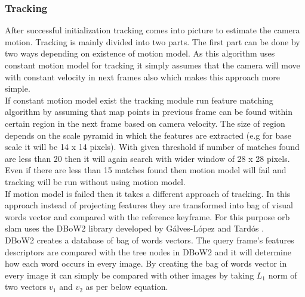 \subsubsection{Tracking}
After successful initialization tracking comes into picture to estimate the camera motion.
Tracking is mainly divided into two parts. The first part can be done by two ways depending on existence of motion model. As this algorithm uses constant motion model for tracking it simply assumes that the camera will move with constant velocity in next frames also which makes this approach more simple. \\
\linebreak
If constant motion model exist the tracking module run feature matching algorithm by assuming that map points in previous frame can be found within certain region in the next frame based on camera velocity. The size of region depends on the scale pyramid in which the features are extracted (e.g for base scale it will be 14 x 14 pixels). With given threshold if number of matches found are less than 20 then it will again search with wider window of 28 x 28 pixels. Even if there are less than 15 matches found then motion model will fail and 
tracking will be run without using motion model.\\
\linebreak
If motion model is failed then it takes a different approach of tracking. In this approach instead of projecting features they are transformed into bag of visual words vector and compared with the reference keyframe. For this purpose \acrshort{orb} \acrshort{slam} uses the DBoW2 library developed by Gálves-López and Tardós \cite{DboW}. \\
\linebreak
DBoW2 creates a database of bag of words vectors. The query frame's features descriptors are compared with the tree nodes in DBoW2 and it will determine how each word occurs in every image. By creating the bag of words vector in every image it can simply be compared with other images by taking $ L_{1} $ norm of two vectors $ v_{1} $ and $ v_{2} $  as per below equation. \\

